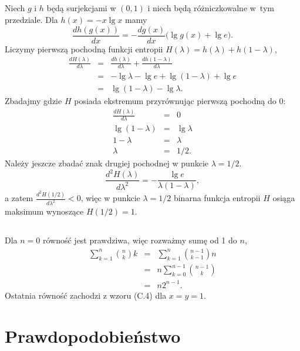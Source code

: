 \subsection{} %
Niech $g$ i $h$ będą surjekcjami w $(0,1)$ i niech będą różniczkowalne w~tym przedziale. Dla $h(x)=-x\lg x$ mamy
\[
	\frac{dh(g(x))}{dx} = -\frac{dg(x)}{dx}\bigl(\lg g(x)+\lg e\bigr).
\]
Liczymy pierwszą pochodną funkcji entropii $H(\lambda)=h(\lambda)+h(1-\lambda)$,
\begin{eqnarray*}
	\frac{dH(\lambda)}{d\lambda} &=& \frac{dh(\lambda)}{d\lambda}+\frac{dh(1-\lambda)}{d\lambda} \\
	&=& -\lg\lambda-\lg e+\lg(1-\lambda)+\lg e \\
	&=& \lg(1-\lambda)-\lg\lambda.
\end{eqnarray*}
Zbadajmy gdzie $H$ posiada ekstremum przyrównując pierwszą pochodną do 0:
\begin{eqnarray*}
	\frac{dH(\lambda)}{d\lambda} &=& 0 \\
	\lg(1-\lambda) &=& \lg\lambda \\
	1-\lambda &=& \lambda \\
	\lambda &=& 1/2.
\end{eqnarray*}
Należy jeszcze zbadać znak drugiej pochodnej w punkcie $\lambda=1/2$.
\[
	\frac{d^2H(\lambda)}{d\lambda^2} = -\frac{\lg e}{\lambda(1-\lambda)},
\]
a zatem $\frac{d^2H(1/2)}{d\lambda^2}<0$, więc w punkcie $\lambda=1/2$ binarna funkcja entropii $H$ osiąga maksimum wynoszące $H(1/2)=1$.

\subsection{} %
Dla $n=0$ równość jest prawdziwa, więc rozważmy sumę od 1 do $n$,
\begin{eqnarray*}
	\sum_{k=1}^n\binom{n}{k}k &=& \sum_{k=1}^n\binom{n-1}{k-1}n \\
	&=& n\sum_{k=0}^{n-1}\binom{n-1}{k} \\
	&=& n2^{n-1}.
\end{eqnarray*}
Ostatnia równość zachodzi z wzoru (C.4) dla $x=y=1$.

\section{Prawdopodobieństwo}

